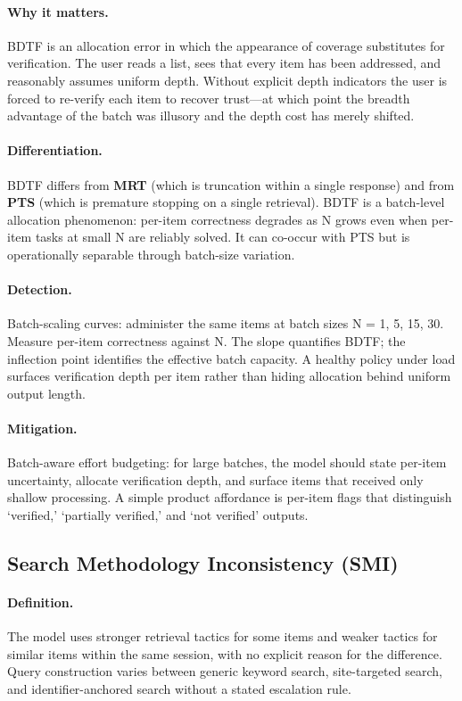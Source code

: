 \documentclass[11pt]{article}
\begin{document}
\paragraph{Why it matters.} BDTF is an allocation error in which the appearance of coverage substitutes for verification. The user reads a list, sees that every item has been addressed, and reasonably assumes uniform depth. Without explicit depth indicators the user is forced to re-verify each item to recover trust---at which point the breadth advantage of the batch was illusory and the depth cost has merely shifted.

\paragraph{Differentiation.} BDTF differs from \textbf{MRT} (which is truncation within a single response) and from \textbf{PTS} (which is premature stopping on a single retrieval). BDTF is a batch-level allocation phenomenon: per-item correctness degrades as N grows even when per-item tasks at small N are reliably solved. It can co-occur with PTS but is operationally separable through batch-size variation.

\paragraph{Detection.} Batch-scaling curves: administer the same items at batch sizes N = 1, 5, 15, 30. Measure per-item correctness against N. The slope quantifies BDTF; the inflection point identifies the effective batch capacity. A healthy policy under load surfaces verification depth per item rather than hiding allocation behind uniform output length.

\paragraph{Mitigation.} Batch-aware effort budgeting: for large batches, the model should state per-item uncertainty, allocate verification depth, and surface items that received only shallow processing. A simple product affordance is per-item flags that distinguish `verified,' `partially verified,' and `not verified' outputs.

\subsection{Search Methodology Inconsistency (SMI)}
\paragraph{Definition.} The model uses stronger retrieval tactics for some items and weaker tactics for similar items within the same session, with no explicit reason for the difference. Query construction varies between generic keyword search, site-targeted search, and identifier-anchored search without a stated escalation rule.
\end{document}
